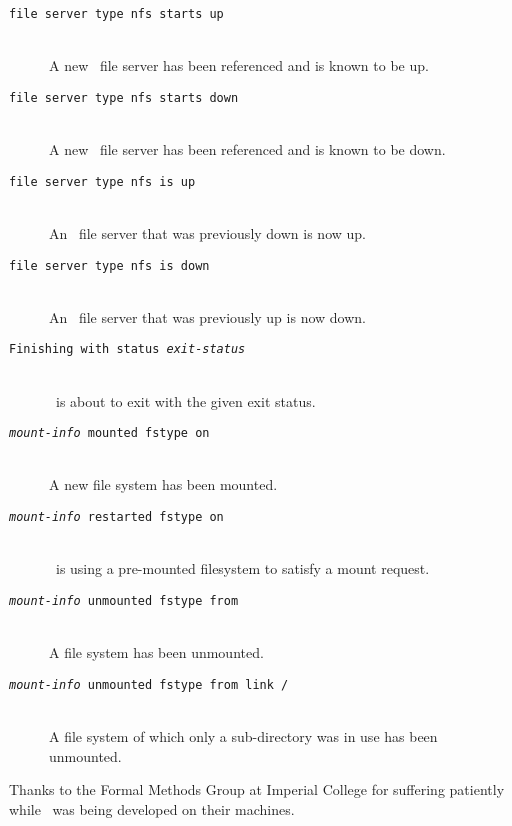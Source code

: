\begin{description}
\item[\tt file server  type nfs starts up]\mbox{}\\
A new \NFS\ file server has been referenced and is known to be up.

\item[\tt file server  type nfs starts down]\mbox{}\\
A new \NFS\ file server has been referenced and is known to be down.

\item[\tt file server  type nfs is up]\mbox{}\\
An \NFS\ file server that was previously down is now up.

\item[\tt file server  type nfs is down]\mbox{}\\
An \NFS\ file server that was previously up is now down.

\item[\tt Finishing with status {\em exit-status}]\mbox{}\\
\Amd\ is about to exit with the given exit status. 

\item[\tt {\em mount-info} mounted fstype  on ]\mbox{}\\
A new file system has been mounted.

\item[\tt {\em mount-info} restarted fstype  on ]\mbox{}\\
\Amd\ is using a pre-mounted filesystem to satisfy a mount request.

\item[\tt {\em mount-info} unmounted fstype  from ]\mbox{}\\
A file system has been unmounted.

\item[\tt {\em mount-info} unmounted fstype  from  link /]\mbox{}\\
A file system of which only a sub-directory was in use has been unmounted.

\end{description}

Thanks to the Formal Methods Group at Imperial College for
suffering patiently while \amd\ was being developed on their machines.

